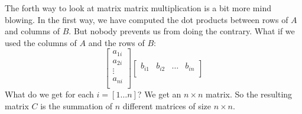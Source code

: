 \documentclass[computationalMathematics.tex]{subfiles}
\begin{document}
\par The forth way to look at matrix matrix multiplication is a bit more mind blowing. In the first way, we have computed the dot products between rows of $A$ and columns of $B$. But nobody prevents us from doing the contrary. What if we used the columns of $A$ and the rows of $B$:
\[
  \begin{bmatrix}
    a_{1i} \\
    a_{2i} \\
    \vdots \\
    a_{ni} \\
\end{bmatrix}
\begin{bmatrix}
    b_{i1} & b_{i2} & \dots & b_{in} \\
\end{bmatrix}
\]
What do we get for each $i=[1 \dots n]$? We get an $n \times n$ matrix. So the resulting matrix $C$ is the summation of $n$ different matrices of size $n \times n$. 
\end{document}
